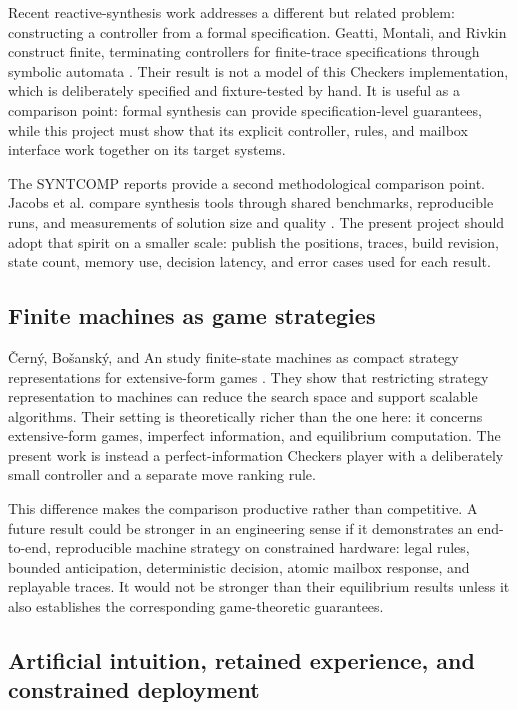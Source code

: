\documentclass[11pt]{article}
\begin{document}
Recent reactive-synthesis work addresses a different but related problem:
constructing a controller from a formal specification. Geatti, Montali, and
Rivkin construct finite, terminating controllers for finite-trace
specifications through symbolic automata \cite{geatti2022declare}. Their
result is not a model of this Checkers implementation, which is deliberately
specified and fixture-tested by hand. It is useful as a comparison point:
formal synthesis can provide specification-level guarantees, while this
project must show that its explicit controller, rules, and mailbox interface
work together on its target systems.

The SYNTCOMP reports provide a second methodological comparison point.
Jacobs et al. compare synthesis tools through shared benchmarks, reproducible
runs, and measurements of solution size and quality
\cite{jacobs2024syntcomp}. The present project should adopt that spirit on a
smaller scale: publish the positions, traces, build revision, state count,
memory use, decision latency, and error cases used for each result.

\subsection{Finite machines as game strategies}

Černý, Bošanský, and An study finite-state machines as compact strategy
representations for extensive-form games \cite{cerny2020fsmgames}. They show
that restricting strategy representation to machines can reduce the search
space and support scalable algorithms. Their setting is theoretically richer
than the one here: it concerns extensive-form games, imperfect information,
and equilibrium computation. The present work is instead a perfect-information
Checkers player with a deliberately small controller and a separate move
ranking rule.

This difference makes the comparison productive rather than competitive. A
future result could be stronger in an engineering sense if it demonstrates an
end-to-end, reproducible machine strategy on constrained hardware: legal
rules, bounded anticipation, deterministic decision, atomic mailbox response,
and replayable traces. It would not be stronger than their equilibrium results
unless it also establishes the corresponding game-theoretic guarantees.

\subsection{Artificial intuition, retained experience, and constrained deployment}
\end{document}
